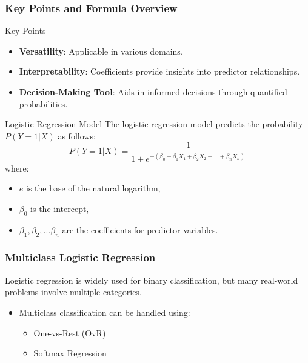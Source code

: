 \documentclass[aspectratio=169]{beamer}
\begin{document}
\begin{frame}[fragile]
    \frametitle{Key Points and Formula Overview}
    \begin{block}{Key Points}
        \begin{itemize}
            \item \textbf{Versatility}: Applicable in various domains.
            \item \textbf{Interpretability}: Coefficients provide insights into predictor relationships.
            \item \textbf{Decision-Making Tool}: Aids in informed decisions through quantified probabilities.
        \end{itemize}
    \end{block}
    \begin{block}{Logistic Regression Model}
        The logistic regression model predicts the probability \( P(Y=1|X) \) as follows:
        \begin{equation}
            P(Y=1|X) = \frac{1}{1 + e^{-(\beta_0 + \beta_1X_1 + \beta_2X_2 + ... + \beta_nX_n)}}
        \end{equation}
        where:
        \begin{itemize}
            \item \( e \) is the base of the natural logarithm,
            \item \( \beta_0 \) is the intercept,
            \item \( \beta_1, \beta_2, ... \beta_n \) are the coefficients for predictor variables.
        \end{itemize}
    \end{block}
\end{frame}

\begin{frame}[fragile]
    \frametitle{Multiclass Logistic Regression}
    Logistic regression is widely used for binary classification, but many real-world problems involve multiple categories.

    \begin{itemize}
        \item Multiclass classification can be handled using:
        \begin{itemize}
            \item One-vs-Rest (OvR)
            \item Softmax Regression
        \end{itemize}
    \end{itemize}
\end{frame}
\end{document}
